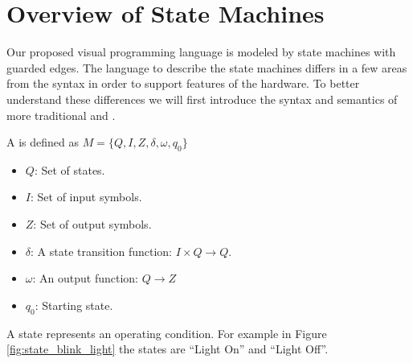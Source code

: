 \section{Overview of State Machines} \label{sec:overviewstatechart}

Our proposed visual programming language is modeled by state machines with guarded edges. The language to describe the state machines differs in a few areas from the  \cite{UML2} syntax in order to support features of the hardware. To better understand these differences we will first introduce the syntax and semantics of more traditional \cite{booth} and \cite{UML2}.

\begin{definition}
A  is defined as $M = \lbrace Q, I, Z, \delta, \omega, q_0\rbrace$

\label{def:statecharts}
\begin{itemize}
	\item $Q$: Set of states.
	\item $I$: Set of input symbols.
	\item $Z$: Set of output symbols.
	\item $\delta$: A state transition function: $I \times Q \rightarrow Q$. 
	\item $\omega$: An output function: $Q \rightarrow Z$
	\item $q_0$: Starting state.
\end{itemize}
\end{definition}

A state represents an operating condition. For example in Figure \ref{fig:state_blink_light} the states are ``Light On'' and ``Light Off''.

